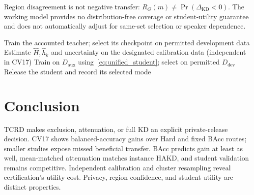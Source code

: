 \documentclass[journal]{IEEEtran}
\theoremstyle{definition}
\theoremstyle{plain}
\begin{document}
Region disagreement is not negative transfer: $R_G(m)\ne\Pr(\Delta_{\mathrm{KD}}<0)$. The working model provides no distribution-free coverage or student-utility guarantee and does not automatically adjust for same-set selection or speaker dependence.

\begin{algorithm}[t]
\caption{Teacher-conditioned private speech release}
\label{alg:tcrd_release}
Train the accounted teacher; select its checkpoint on permitted development data\;
Estimate $\widehat H,\widehat h_k$ and uncertainty on the designated calibration data (independent in CV17)\;
Train on $D_{\mathrm{aux}}$ using~\eqref{eq:unified_student}; select on permitted $D_{\mathrm{dev}}$\;
Release the student and record its selected mode\;
\end{algorithm}




\section{Conclusion}
\label{sec:conclusion}
TCRD makes exclusion, attenuation, or full KD an explicit private-release decision. CV17 shows balanced-accuracy gains over Hard and fixed BAcc routes; smaller studies expose missed beneficial transfer. BAcc predicts gain at least as well, mean-matched attenuation matches instance HAKD, and student validation remains competitive. Independent calibration and cluster resampling reveal certification's utility cost. Privacy, region confidence, and student utility are distinct properties.


\end{document}
